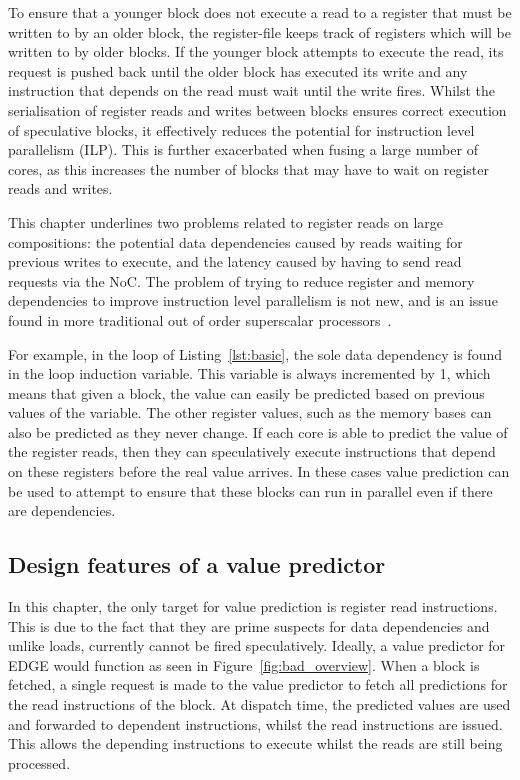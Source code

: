 To ensure that a younger block does not execute a read to a register that must be written to by an older block, the register-file keeps track of registers which will be written to by older blocks.
If the younger block attempts to execute the read, its request is pushed back until the older block has executed its write and any instruction that depends on the read must wait until the write fires.
Whilst the serialisation of register reads and writes between blocks ensures correct execution of speculative blocks, it effectively reduces the potential for instruction level parallelism (ILP).
This is further exacerbated when fusing a large number of cores, as this increases the number of blocks that may have to wait on register reads and writes.

This chapter underlines two problems related to register reads on large compositions: the potential data dependencies caused by reads waiting for previous writes to execute, and the latency caused by having to send read requests via the NoC.
The problem of trying to reduce register and memory dependencies to improve instruction level parallelism is not new, and is an issue found in more traditional out of order superscalar processors~\cite{peraisVTAGE2014}.

For example, in the loop of Listing~\ref{lst:basic}, the sole data dependency is found in the loop induction variable.
This variable is always incremented by 1, which means that given a block, the value can easily be predicted based on previous values of the variable.
The other register values, such as the memory bases can also be predicted as they never change.
If each core is able to predict the value of the register reads, then they can speculatively execute instructions that depend on these registers before the real value arrives.
In these cases value prediction can be used to attempt to ensure that these blocks can run in parallel even if there are dependencies.


\subsection{Design features of a value predictor}

In this chapter, the only target for value prediction is register read instructions.
This is due to the fact that they are prime suspects for data dependencies and unlike loads, currently cannot be fired speculatively.
Ideally, a value predictor for EDGE would function as seen in Figure~\ref{fig:bad_overview}.
When a block is fetched, a single request is made to the value predictor to fetch all predictions for the read instructions of the block.
At dispatch time, the predicted values are used and forwarded to dependent instructions, whilst the read instructions are issued.
This allows the depending instructions to execute whilst the reads are still being processed.


